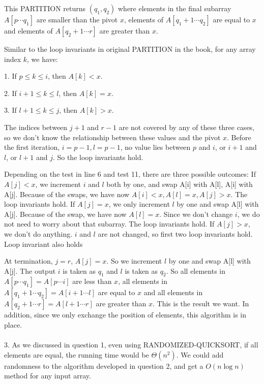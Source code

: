 \documentclass[twoside,11pt]{homework}
\begin{document}
 This PARTITION returns $(q_1, q_2)$ where elements in the final subarray $A[p \cdots q_1]$ are smaller than the pivot $x$, elements of $A[q_1+1 \cdots q_2]$ are equal to $x$ and elements of $A[q_2+1 \cdots r]$ are greater than $x$.
 
Similar to the loop invariants in original PARTITION in the book, for any array index $k$, we have:

1. If $p \le k \le i$, then $A[k] < x$.

2. If $i+1 \le k \le l$, then $A[k] = x$.

3. If $l+1 \le k \le j$, then $A[k] > x$. 

The indices between $j+1$ and $r-1$ are not covered by any of these three cases, so we don't know the relationship between these values and the pivot $x$. 
 Before the first iteration, $i = p-1, l = p-1$, no value lies between $p$ and $i$, or $i+1$ and $l$, or $l+1$ and $j$. 
 So the loop invariants hold.
 
 Depending on the test in line 6 and test 11, there are three possible outcomes:
 If $A[j] < x$, we increment $i$ and $l$ both by one, and swap A[i] with A[l], A[i] with A[j].
 Because of the swaps, we have now $A[i] < x, A[l] = x, A[j] > x$.
 The loop invariants hold.
 If $A[j] = x$, we only increment $l$ by one and swap A[l] with A[j].
 Because of the swap, we have now $A[l] = x$.
 Since we don't change $i$, we do not need to worry about that subarray.
 The loop invariants hold.
  If $A[j] > x$, we don't do anything. 
  $i$ and $l$ are not changed, so first two loop invariants hold.
  Loop invariant also holds
 
 At termination, $j = r$, $A[j] = x$.
 So we increment $l$ by one and swap A[l] with A[j].
 The output $i$ is taken as $q_1$ and $l$ is taken as $q_2$.
 So all elements in $A[p \cdots q_1] =  A[p \cdots i]$ are less than $x$, all elements in $A[q_1+1 \cdots q_2] =  A[i+1 \cdots l]$ are equal to $x$ and all elements in $A[q_2+1 \cdots r] =  A[l+1 \cdots r]$ are greater than $x$.
 This is the result we want.
 In addition, since we only exchange the position of elements, this algorithm is in place. 
 \\\\
 3. 
 As we discussed in question 1, even using RANDOMIZED-QUICKSORT, if all elements are equal, the running time would be $\Theta (n^2)$.
 We could add randomness to the algorithm developed in question 2, and get a $O(n \log n)$ method for any input array.
 
\end{document}
